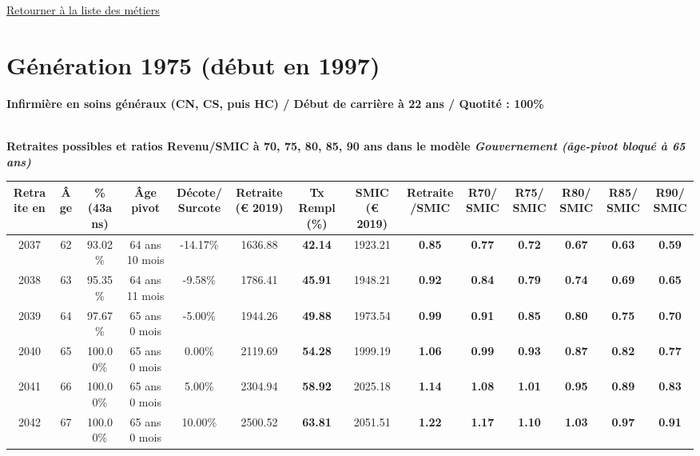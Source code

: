 \hyperlink{page.2}{\noindent Retourner à la liste des métiers}

 \newpage 

\section{Génération 1975 (début en 1997)\label{Infirmier_100_1975_22_0}} 
 
{\bf \noindent Infirmière en soins généraux (CN, CS, puis HC) / Début de carrière à 22 ans / Quotité : 100\%}  ~ 

 ~\\{\bf \noindent Retraites possibles et ratios Revenu/SMIC à 70, 75, 80, 85, 90 ans dans le modèle \emph{Gouvernement (âge-pivot bloqué à 65 ans)}}  
 
\begin{adjustbox}{max width=\textwidth} 
\begin{tabular}[htb]{|c|c||c|c|c||c|c||c|c||c|c|c|c|c|} 
\hline 
 Retraite en &  Âge &  \%(43ans) &  Âge pivot &  Décote/Surcote &  Retraite (\euro{} 2019) &  Tx Rempl(\%) &  SMIC (\euro{} 2019) &  Retraite/SMIC &  R70/SMIC &  R75/SMIC &  R80/SMIC &  R85/SMIC &  R90/SMIC \\ 
\hline \hline 
 2037 &  62 &  93.02\% &  64 ans 10 mois &  -14.17\% &  1636.88 &  {\bf 42.14} &  1923.21 &  {\bf {\color{red} 0.85}} &  {\bf {\color{red} 0.77}} &  {\bf {\color{red} 0.72}} &  {\bf {\color{red} 0.67}} &  {\bf {\color{red} 0.63}} &  {\bf {\color{red} 0.59}} \\ 
\hline 
 2038 &  63 &  95.35\% &  64 ans 11 mois &  -9.58\% &  1786.41 &  {\bf 45.91} &  1948.21 &  {\bf {\color{red} 0.92}} &  {\bf {\color{red} 0.84}} &  {\bf {\color{red} 0.79}} &  {\bf {\color{red} 0.74}} &  {\bf {\color{red} 0.69}} &  {\bf {\color{red} 0.65}} \\ 
\hline 
 2039 &  64 &  97.67\% &  65 ans 0 mois &  -5.00\% &  1944.26 &  {\bf 49.88} &  1973.54 &  {\bf {\color{red} 0.99}} &  {\bf {\color{red} 0.91}} &  {\bf {\color{red} 0.85}} &  {\bf {\color{red} 0.80}} &  {\bf {\color{red} 0.75}} &  {\bf {\color{red} 0.70}} \\ 
\hline 
 2040 &  65 &  100.00\% &  65 ans 0 mois &  0.00\% &  2119.69 &  {\bf 54.28} &  1999.19 &  {\bf 1.06} &  {\bf {\color{red} 0.99}} &  {\bf {\color{red} 0.93}} &  {\bf {\color{red} 0.87}} &  {\bf {\color{red} 0.82}} &  {\bf {\color{red} 0.77}} \\ 
\hline 
 2041 &  66 &  100.00\% &  65 ans 0 mois &  5.00\% &  2304.94 &  {\bf 58.92} &  2025.18 &  {\bf 1.14} &  {\bf 1.08} &  {\bf 1.01} &  {\bf {\color{red} 0.95}} &  {\bf {\color{red} 0.89}} &  {\bf {\color{red} 0.83}} \\ 
\hline 
 2042 &  67 &  100.00\% &  65 ans 0 mois &  10.00\% &  2500.52 &  {\bf 63.81} &  2051.51 &  {\bf 1.22} &  {\bf 1.17} &  {\bf 1.10} &  {\bf 1.03} &  {\bf {\color{red} 0.97}} &  {\bf {\color{red} 0.91}} \\ 
\hline 
\hline 
\end{tabular} 
\end{adjustbox} 
 

